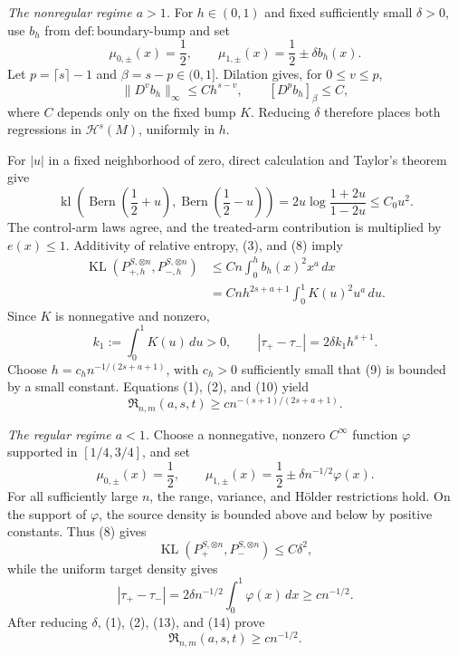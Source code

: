 \emph{The nonregular regime \(a>1\).}
For \(h\in(0,1)\) and fixed sufficiently small \(\delta>0\), use \(b_h\) from \(\mathrm{def:boundary\text{-}bump}\) and set
\[
 \mu_{0,\pm}(x)=\frac12,
 \qquad
 \mu_{1,\pm}(x)=\frac12\pm\delta b_h(x).
\tag{6}
\]
Let \(p=\lceil s\rceil-1\) and \(\beta=s-p\in(0,1]\). Dilation gives, for \(0\le v\le p\),
\[
 \lVert D^v b_h\rVert_\infty\le C h^{s-v},
 \qquad [D^p b_h]_{\beta}\le C,
\tag{7}
\]
where \(C\) depends only on the fixed bump \(K\). Reducing \(\delta\) therefore places both regressions in \(\mathcal H^s(M)\), uniformly in \(h\).

For \(|u|\) in a fixed neighborhood of zero, direct calculation and Taylor's theorem give
\[
 \operatorname{kl}\!\left(
  \operatorname{Bern}\!\left(\frac12+u\right),
  \operatorname{Bern}\!\left(\frac12-u\right)
 \right)
 =2u\log\frac{1+2u}{1-2u}
 \le C_0u^2.
\tag{8}
\]
The control-arm laws agree, and the treated-arm contribution is multiplied by \(e(x)\le1\). Additivity of relative entropy, (3), and (8) imply
\[
 \begin{aligned}
 \operatorname{KL}(P_{+,h}^{S,\otimes n},P_{-,h}^{S,\otimes n})
 &\le Cn\int_0^h b_h(x)^2x^a\,dx\\
 &=Cnh^{2s+a+1}\int_0^1K(u)^2u^a\,du.
 \end{aligned}
\tag{9}
\]
Since \(K\) is nonnegative and nonzero,
\[
 k_1:=\int_0^1K(u)\,du>0,
 \qquad
 |\tau_+-\tau_-|=2\delta k_1h^{s+1}.
\tag{10}
\]
Choose \(h=c_hn^{-1/(2s+a+1)}\), with \(c_h>0\) sufficiently small that (9) is bounded by a small constant. Equations (1), (2), and (10) yield
\[
 \mathfrak R_{n,m}(a,s,t)
 \ge c n^{-(s+1)/(2s+a+1)}.
\tag{11}
\]

\emph{The regular regime \(a<1\).}
Choose a nonnegative, nonzero \(C^\infty\) function \(\varphi\) supported in \([1/4,3/4]\), and set
\[
 \mu_{0,\pm}(x)=\frac12,
 \qquad
 \mu_{1,\pm}(x)=\frac12\pm\delta n^{-1/2}\varphi(x).
\tag{12}
\]
For all sufficiently large \(n\), the range, variance, and H\"older restrictions hold. On the support of \(\varphi\), the source density is bounded above and below by positive constants. Thus (8) gives
\[
 \operatorname{KL}(P_+^{S,\otimes n},P_-^{S,\otimes n})
 \le C\delta^2,
\tag{13}
\]
while the uniform target density gives
\[
 |\tau_+-\tau_-|
 =2\delta n^{-1/2}\int_0^1\varphi(x)\,dx
 \ge c n^{-1/2}.
\tag{14}
\]
After reducing \(\delta\), (1), (2), (13), and (14) prove
\[
 \mathfrak R_{n,m}(a,s,t)\ge c n^{-1/2}.
\tag{15}
\]

